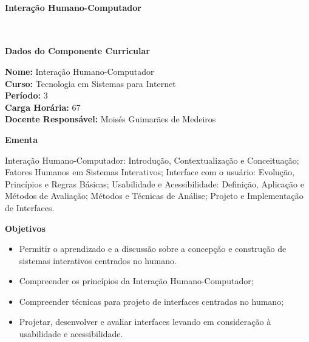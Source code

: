 \paragraph{Intera\c{c}\~ao Humano-Computador} \


\begin{snugshade}\begin{center}\textbf{
    Dados do Componente Curricular
}\end{center}\end{snugshade}

\noindent \textbf{Nome:}                Intera\c{c}\~ao Humano-Computador
\\        \textbf{Curso:}               Tecnologia em Sistemas para Internet
\\        \textbf{Período:}             \unit{3}{\degree}
\\        \textbf{Carga Horária:}       \unit{67}{\hour}
\\        \textbf{Docente Responsável:} Moisés Guimarães de Medeiros


\begin{snugshade}\begin{center}\textbf{
    Ementa
\vphantom{q}}\end{center}\end{snugshade}

\noindent
Interação Humano-Computador: Introdução, Contextualização e Conceituação; Fatores Humanos em Sistemas Interativos; Interface com o usuário: Evolução, Princípios e Regras Básicas; Usabilidade e Acessibilidade: Definição, Aplicação e Métodos de Avaliação; Métodos e Técnicas de Análise; Projeto e Implementação de Interfaces.


\begin{snugshade}\begin{center}\textbf{
    Objetivos
}\end{center}\end{snugshade}

\begin{itemize}

\item Permitir o aprendizado e a discussão sobre a concepção e construção de sistemas interativos centrados no humano.

\item Compreender os princípios da Interação Humano-Computador;

\item Compreender técnicas para projeto de interfaces centradas no humano;

\item Projetar, desenvolver e avaliar interfaces levando em consideração à usabilidade e acessibilidade.

\end{itemize} 

